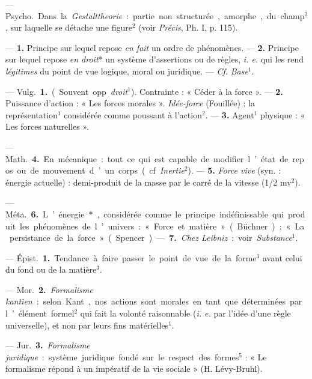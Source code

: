 \begin{itemize}[leftmargin=1cm, label=, itemsep=1pt]
 — \si{Psycho.} Dans la {\it Gestalttheorie} : partie non structurée,
amorphe, du champ$^2$, sur laquelle se détache une figure$^2$
(voir {\it Précis}, Ph. I, p. 115).

 — {\bf 1.} Principe sur lequel repose {\it en fait} un ordre
de phénomènes. — {\bf 2.} Principe sur lequel repose {\it en droit}* un
système d’assertions ou de règles, {\it i. e.} qui les rend {\it légitimes}
du point de vue logique, moral ou juridique. — {\it Cf.} {\it Base}$^1$.

 — \si{Vulg.} {\bf 1.} (Souvent opp. {\it droit}$^1$). Contrainte :
« Céder à la force ». — {\bf 2.} Puissance d'action : « Les forces morales ».
{\it Idée-force} (Fouillée) : la représentation$^1$ considérée comme poussant
à l’action$^2$. — {\bf 3.} Agent$^1$ physique : « Les forces naturelles ».

— \si{Math.} {\bf 4.} En mécanique : tout ce qui est capable de modifier l’état de
repos ou de mouvement d’un corps (cf. {\it Inertie}$^2$). — {\bf 5.}
{\it Force vive} (syn. : énergie actuelle) : demi-produit de la masse par le
carré de la vitesse (1/2 mv$^2$).

— \si{Méta.} {\bf 6.} L’énergie*, considérée comme le principe indéfinissable
qui produit les phénomènes de l’univers : « Force et matière » (Büchner) ;
« La persistance de la force » (Spencer). — {\bf 7.} {\it Chez Leibniz} :
voir {\it Substance}$^1$.

 — \si{Épist.} {\bf 1.} Tendance à
faire passer le point de vue de la
forme$^3$ avant celui du fond ou de la matière$^3$.

— \si{Mor.} {\bf 2.} {\it Formalisme kantien} : selon Kant, nos actions sont
morales en tant que déterminées par l’élément formel$^2$ qui fait la volonté
raisonnable ({\it i. e.} par l’idée d’une règle universelle), et non par
leurs fins matérielles$^1$.

— \si{Jur.} {\bf 3.} {\it Formalisme juridique} : système juridique fondé sur
le respect des formes$^5$ : « Le formalisme répond à un impératif de la vie
sociale » (H. Lévy-Bruhl).


\end{itemize}

